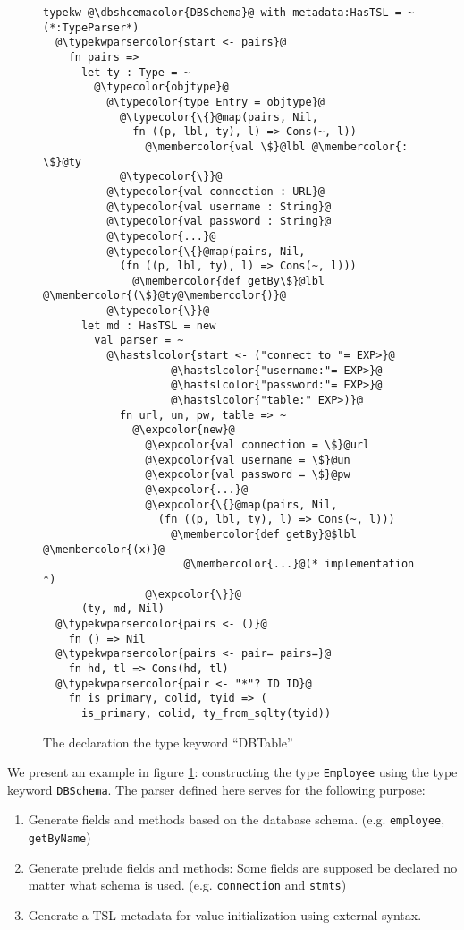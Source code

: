 \documentclass{sig-alternate}
\newcommand{\typekwparsercolor}[1]{\textcolor[HTML]{7C803E}{#1}}
\newcommand{\expcolor}[1]{\textcolor[HTML]{FF0033}{#1}}
\newcommand{\membercolor}[1]{\textcolor[HTML]{FF6600}{#1}}
\newcommand{\typecolor}[1]{\textcolor[HTML]{660066}{#1}}
\newcommand{\hastslcolor}[1]{\textcolor[HTML]{002FC9}{#1}}
\newcommand{\dbshcemacolor}[1]{\textcolor[HTML]{5AC3D1}{#1}}
\newcommand{\mycaption}[1]{\vspace{-4px}\caption{#1}\vspace{-2px}}
\begin{document}
\begin{figure}[ht]
\begin{lstlisting}[style=wyvern]
typekw @\dbshcemacolor{DBSchema}@ with metadata:HasTSL = ~ (*:TypeParser*)
  @\typekwparsercolor{start <- pairs}@
    fn pairs =>
      let ty : Type = ~
        @\typecolor{objtype}@
          @\typecolor{type Entry = objtype}@
            @\typecolor{\{}@map(pairs, Nil, 
              fn ((p, lbl, ty), l) => Cons(~, l))
                @\membercolor{val \$}@lbl @\membercolor{:  \$}@ty
            @\typecolor{\}}@
          @\typecolor{val connection : URL}@
          @\typecolor{val username : String}@
          @\typecolor{val password : String}@
          @\typecolor{...}@
          @\typecolor{\{}@map(pairs, Nil, 
            (fn ((p, lbl, ty), l) => Cons(~, l)))
              @\membercolor{def getBy\$}@lbl @\membercolor{(\$}@ty@\membercolor{)}@
          @\typecolor{\}}@
      let md : HasTSL = new 
        val parser = ~
          @\hastslcolor{start <- ("connect to "= EXP>}@
                    @\hastslcolor{"username:"= EXP>}@
                    @\hastslcolor{"password:"= EXP>}@
                    @\hastslcolor{"table:" EXP>)}@
            fn url, un, pw, table => ~
              @\expcolor{new}@ 
                @\expcolor{val connection = \$}@url
                @\expcolor{val username = \$}@un
                @\expcolor{val password = \$}@pw
                @\expcolor{...}@
                @\expcolor{\{}@map(pairs, Nil, 
                  (fn ((p, lbl, ty), l) => Cons(~, l)))
                    @\membercolor{def getBy}@$lbl @\membercolor{(x)}@ 
                      @\membercolor{...}@(* implementation *)
                @\expcolor{\}}@
      (ty, md, Nil)
  @\typekwparsercolor{pairs <- ()}@
    fn () => Nil 
  @\typekwparsercolor{pairs <- pair= pairs=}@
    fn hd, tl => Cons(hd, tl)
  @\typekwparsercolor{pair <- "*"? ID ID}@
    fn is_primary, colid, tyid => (
      is_primary, colid, ty_from_sqlty(tyid))
\end{lstlisting}
\mycaption{The declaration the type keyword ``DBTable''}
\label{typekw-example-1}
\end{figure}
We present an example in figure \ref{typekw-example-1}: constructing the type \verb|Employee| using the type keyword \verb|DBSchema|. The parser defined here serves for the following purpose:
\begin{enumerate}\setlength{\itemsep}{0pt}
\item Generate fields and methods based on the database schema. (e.g. \verb|employee|, \verb|getByName|)
\item Generate prelude fields and methods: Some fields are supposed be declared no matter what schema is used. (e.g. \verb|connection| and \verb|stmts|)
\item Generate a TSL metadata for value initialization using external syntax. 
\end{enumerate}
\end{document}
